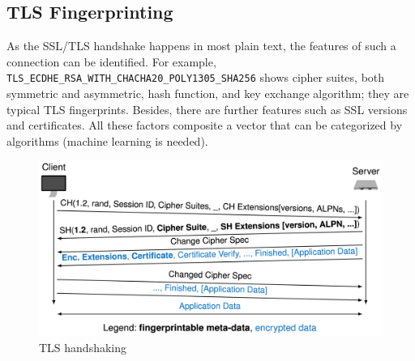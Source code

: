 \subsection{TLS Fingerprinting}
\begin{frame}

    \small
    As the SSL/TLS handshake happens in most plain text, the features of such a connection can be identified. For example, \texttt{TLS\_ECDHE\_RSA\_WITH\_CHACHA20\_POLY1305\_SHA256} shows cipher suites, both symmetric and asymmetric, hash function, and key exchange algorithm; they are typical TLS fingerprints. Besides, there are further features such as SSL versions and certificates.
    All these factors composite a vector that can be categorized by algorithms (machine learning is needed).
    \begin{figure}
        \centering
        \includegraphics[scale=0.15]{pics/TLS_Handshake.png}
        \caption{\small TLS handshaking \cite{TLS_handshake}}
        \label{fig:fallback}
    \end{figure}
\end{frame}

